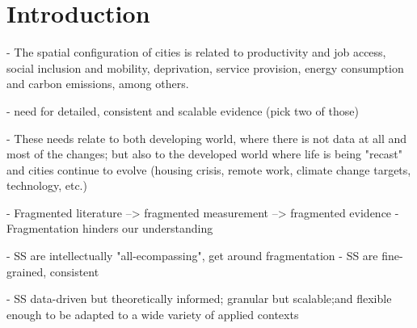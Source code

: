 \section{Introduction}
\label{sec:intro}











- The spatial configuration of cities is related to productivity and job
  access, social inclusion and mobility, deprivation, service provision,
  energy consumption and carbon emissions, among others.

- need for detailed, consistent and scalable evidence (pick two of those)

- These needs relate to both developing world, where there is not data at all
  and most of the changes; but also to the developed world where life is being
  "recast" and cities continue to evolve (housing crisis, remote work, climate
  change targets, technology, etc.)

- Fragmented literature --> fragmented measurement --> fragmented evidence
- Fragmentation hinders our understanding

- SS are intellectually "all-ecompassing", get around fragmentation
- SS are fine-grained, consistent

- SS data-driven but theoretically informed; granular but scalable;and flexible enough to be adapted to a wide variety of applied contexts


